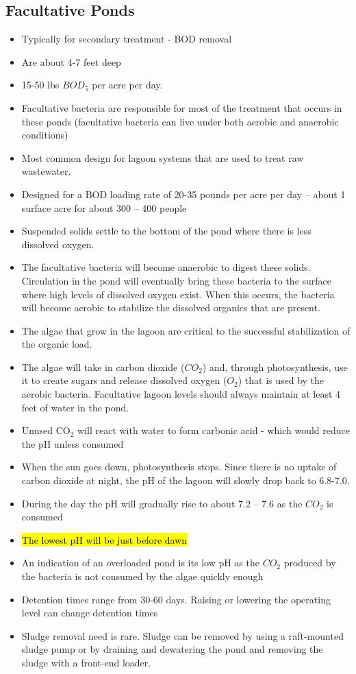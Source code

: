 \subsection{Facultative Ponds}	

\begin{itemize}
\item Typically for secondary treatment - BOD removal
\item Are about 4-7 feet deep
\item 15-50 lbs $BOD_5$ per acre per day.
\item Facultative bacteria are responsible for most of the treatment that occurs in these ponds (facultative bacteria can live under both aerobic and anaerobic conditions)
\item Most common design for lagoon systems that are used to treat raw wastewater. 
\item Designed for a BOD loading rate of 20-35 pounds per acre per day – about 1 surface acre for about 300 – 400 people
\item Suspended solids settle to the bottom of the pond where there is less dissolved oxygen.  
\item The facultative bacteria will become anaerobic to digest these solids. Circulation in the pond will eventually bring these bacteria to the surface where high levels of dissolved oxygen exist. When this occurs, the bacteria will become aerobic to stabilize the dissolved organics that are present.
\item The algae that grow in the lagoon are critical to the successful stabilization of the organic load. 
\item The algae will take in carbon dioxide ($CO_2$) and, through photosynthesis, use it to create sugars and release dissolved oxygen ($O_2$) that is used by the aerobic bacteria. Facultative lagoon levels should always maintain at least 4 feet of water in the pond.
\item Unused CO$_2$ will react with water to form carbonic acid - which would reduce the pH unless consumed
\item When the sun goes down, photosynthesis stops. Since there is no uptake of carbon dioxide at night, the pH of the lagoon will slowly drop back to 6.8-7.0.
\item During the day the pH will gradually rise to about 7.2 – 7.6 as the $CO_2$ is consumed
\item \hl{The lowest pH will be just before dawn} 
\item An indication of an overloaded pond is its low pH as the $CO_2$ produced by the bacteria is not consumed by the algae quickly enough
\item Detention times range from 30-60 days. Raising or lowering the operating level can change detention times
\item Sludge removal need is rare.  Sludge can be removed by using a raft-mounted sludge pump or by draining and dewatering the pond and removing the sludge with a front-end loader.
\end{itemize} 

